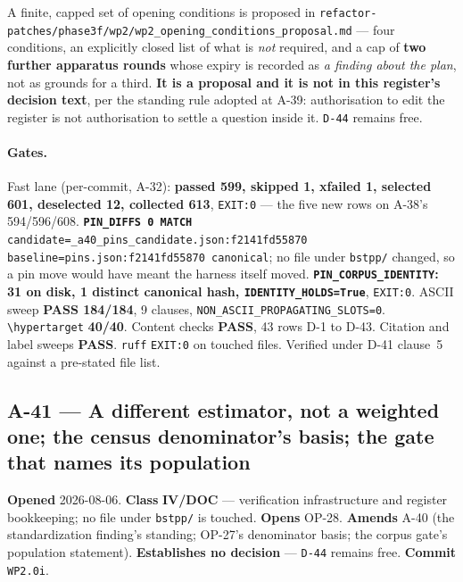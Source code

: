 \documentclass[
  10pt,
]{article}
\begin{document}
A finite, capped set of opening conditions is proposed in \texttt{refactor-patches/\allowbreak{}phase3f/wp2/\allowbreak{}wp2\_opening\_conditions\_proposal.md} --- four conditions, an explicitly closed list of what is \emph{not} required, and a cap of \textbf{two further apparatus rounds} whose expiry is recorded as \emph{a finding about the plan}, not as grounds for a third. \textbf{It is a proposal and it is not in this register's decision text}, per the standing rule adopted at A-39: authorisation to edit the register is not authorisation to settle a question inside it. \texttt{D-44} remains free.

\paragraph{Gates.}
Fast lane (per-commit, A-32): \textbf{passed 599, skipped 1, xfailed 1, selected 601, deselected 12, collected 613}, \texttt{EXIT:0} --- the five new rows on A-38's 594/596/608. \textbf{\texttt{PIN\_DIFFS 0 MATCH}} \texttt{candidate=\allowbreak{}\_a40\_pins\_candidate.json:\allowbreak{}f2141fd55870 baseline=\allowbreak{}pins.json:\allowbreak{}f2141fd55870 canonical}; no file under \texttt{bstpp/} changed, so a pin move would have meant the harness itself moved. \textbf{\texttt{PIN\_CORPUS\_IDENTITY}: 31 on disk, 1 distinct canonical hash, \texttt{IDENTITY\_HOLDS=True}}, \texttt{EXIT:0}. ASCII sweep \textbf{PASS 184/184}, 9 clauses, \texttt{NON\_ASCII\_PROPAGATING\_SLOTS=0}. \texttt{\textbackslash hypertarget} \textbf{40/40}. Content checks \textbf{PASS}, 43 rows D-1 to D-43. Citation and label sweeps \textbf{PASS}. \texttt{ruff} \texttt{EXIT:0} on touched files. Verified under D-41 clause~5 against a pre-stated file list.

\hypertarget{a-41}{%
\subsection{A-41 --- A different estimator, not a weighted one; the census denominator's basis; the gate that names its population}\label{a-41}}

\textbf{Opened} 2026-08-06. \textbf{Class} \textbf{IV/DOC} --- verification infrastructure and register bookkeeping; no file under \texttt{bstpp/} is touched. \textbf{Opens} OP-28. \textbf{Amends} A-40 (the standardization finding's standing; OP-27's denominator basis; the corpus gate's population statement). \textbf{Establishes no decision} --- \texttt{D-44} remains free. \textbf{Commit} \texttt{WP2.0i}.
\end{document}
